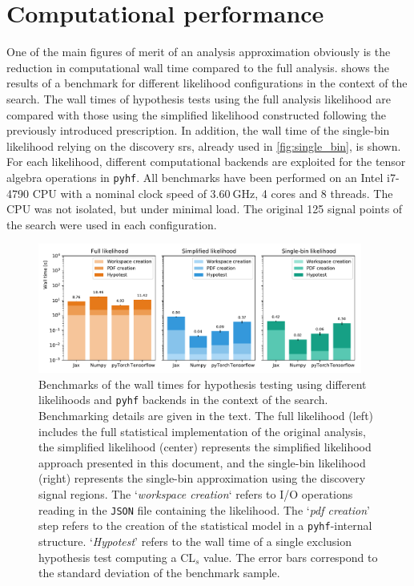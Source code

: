 \section{Computational performance}\label{sec:cpu_performance}

One of the main figures of merit of an analysis approximation obviously is the reduction in computational wall time compared to the full analysis.  shows the results of a benchmark for different likelihood configurations in the context of the \onelepton search.
The wall times of hypothesis tests using the full analysis likelihood are compared with those using the simplified likelihood constructed following the previously introduced prescription.
In addition, the wall time of the single-bin likelihood relying on the discovery \glspl{sr}, already used in \cref{fig:single_bin}, is shown.
For each likelihood, different computational backends are exploited for the tensor algebra operations in \texttt{pyhf}. All benchmarks have been performed on an Intel i7-4790 CPU with a nominal clock speed of $\SI{3.60}{\GHz}$, 4 cores and 8 threads.
The CPU was not isolated, but under minimal load.
The original 125 signal points of the \onelepton search were used in each configuration.

\begin{figure}
	\centering    
	\includegraphics[width=0.95\textwidth]{benchmark_1Lbb}
	\caption{Benchmarks of the wall times for hypothesis testing using different likelihoods and \texttt{pyhf} backends in the context of the \onelepton search. Benchmarking details are given in the text. The full likelihood (left) includes the full statistical implementation of the original analysis, the simplified likelihood (center) represents the simplified likelihood approach presented in this document, and the single-bin likelihood (right) represents the single-bin approximation using the discovery signal regions. The `\textit{workspace creation}` refers to I/O operations reading in the \texttt{JSON} file containing the likelihood. The `\textit{pdf creation}' step refers to the creation of the statistical model in a \texttt{pyhf}-internal structure. `\textit{Hypotest}' refers to the wall time of a single exclusion hypothesis test computing a CL$_s$ value. The error bars correspond to the standard deviation of the benchmark sample.}\label{fig:benchmark}
	\label{fig:benchmark_1Lbb}
\end{figure}

